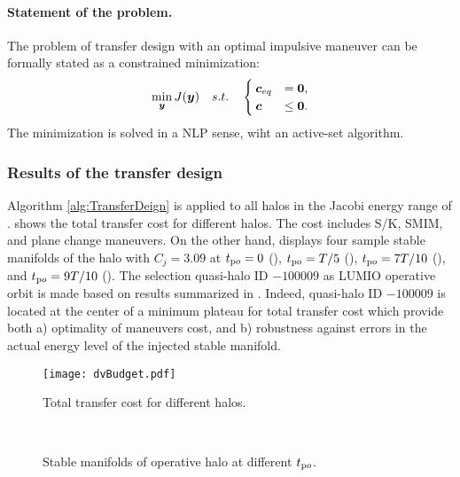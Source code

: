 \paragraph{Statement of the problem.}
	The problem of transfer design with an optimal impulsive maneuver can be formally stated as a constrained minimization:
	\begin{align}\label{pb:minimizaionTransferDesign}
	\min_{\boldsymbol{y}}{J(\boldsymbol{y})}\quad s.t. \quad
	\begin{cases}
	\boldsymbol{c}_{eq} &= \boldsymbol{0}, \\
	\boldsymbol{c} &\le \boldsymbol{0}.
	\end{cases}
	\end{align}
	The minimization is solved in a {NLP} sense, wiht an active-set algorithm.


\subsubsection{Results of the transfer design }\label{subsubsec:TransferDesignResults}
Algorithm \ref{alg:TransferDeign} is applied to all halos in the Jacobi energy range of .  shows the total transfer cost for different halos. The cost includes S/K, SMIM, and plane change maneuvers. On the other hand,  displays four sample stable manifolds of the halo with $C_j = 3.09$ at $t_{\textrm po}=0$ (), $t_{\textrm po}=T/5$ (), $t_{\textrm po}=7T/10$ (), and $t_{\textrm po}=9T/10$ (). The selection quasi-halo ID $-100009$ as LUMIO operative orbit is made based on results summarized in . Indeed, quasi-halo ID $-100009$ is located at the center of a minimum plateau for total transfer cost which provide both a) optimality of maneuvers cost, and b) robustness against errors in the actual energy level of the injected stable manifold.
%
\begin{figure*}[t!]
	\centering
	\texttt{[image: dvBudget.pdf]}
	\caption{Total transfer cost for different halos.}
	\label{fig:TotalTransferCost}
\end{figure*}
%
%
\begin{figure}[b!]
	\centering
	\hfill
	\hfill
	 \\
	\hfill
	\hfill
	\hfill
	\caption{Stable manifolds of operative halo at different $t_{\textrm po}$.}
	\label{fig:Halo9SampleStableManifold}
\end{figure}
%

